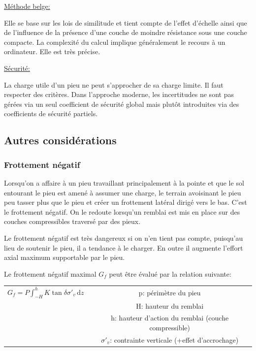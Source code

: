         \underline{Méthode belge:} 
        
        Elle se base sur les lois de similitude et tient compte de l'effet d'échelle ainsi que de l'influence de la présence d'une couche de moindre résistance sous une couche compacte. La complexité du calcul implique généralement le recours à un ordinateur. Elle est très précise. 
        
        \underline{Sécurité:} 
        
        La charge utile d'un pieu ne peut s'approcher de sa charge limite. Il faut respecter des critères. Dans l'approche moderne, les incertitudes ne sont pas gérées via un seul coefficient de sécurité global mais plutôt introduites via des coefficients de sécurité partiels.
        
    \subsection{Autres considérations}
    
        \subsubsection{Frottement négatif}
        
        Lorsqu'on a affaire à un pieu travaillant principalement à la pointe et que le sol entourant le pieu est amené à assumer une charge, le terrain avoisinant le pieu peu tasser plus que le pieu et créer un frottement latéral dirigé vers le bas. C'est le frottement négatif. On le redoute lorsqu'un remblai est mis en place sur des couches compressibles traversé par des pieux.
        
        Le frottement négatif est très dangereux si on n'en tient pas compte, puisqu'au lieu de soutenir le pieu, il a tendance à le charger. En outre il augmente l'effort axial maximum supportable par le pieu.
        
        Le frottement négatif maximal $G_f$ peut être évalué par la relation suivante:
        
        \begin{center}
        \begin{tabular}{c|c}
             $G_f = P \int_{-H}^h K \tan \delta \sigma'_v \, \mathrm{d}z $ \: \: \:
             &  p: périmètre du pieu   \\
             &  H: hauteur du remblai  \\
             &  h: hauteur d'action du remblai (couche compressible)  \\
             &  $\sigma'_v$: contrainte verticale (+effet d'accrochage)  
        \end{tabular}
        \end{center} 
        
